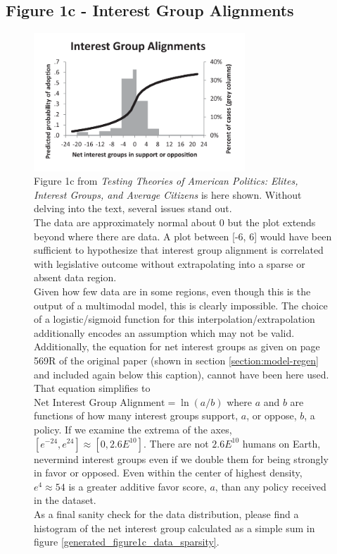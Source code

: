 \documentclass[]{article}
\begin{document}
\subsection{Figure 1c - Interest Group Alignments}
\begin{figure}[H]
	\begin{center}
		\includegraphics[width=300px]{./figures/paper/interest-group-preferences.png}
	\end{center}	
	\caption{Figure 1c from \textit{Testing Theories of American Politics: Elites, Interest Groups, and Average Citizens} is here shown. Without delving into the text, several issues stand out. \\The data are approximately normal about 0 but the plot extends beyond where there are data. A plot between [-6, 6] would have been sufficient to hypothesize that interest group alignment is correlated with legislative outcome without extrapolating into a sparse or absent data region. \\Given how few data are in some regions, even though this is the output of a multimodal model, this is clearly impossible. The choice of a logistic/sigmoid function for this interpolation/extrapolation additionally encodes an assumption which may not be valid. \\Additionally, the equation for net interest groups as given on page 569R of the original paper (shown in section \ref{section:model-regen} and included again below this caption), cannot have been here used. That equation simplifies to $\text{Net Interest Group Alignment} = \ln(a/b)$ where $a$ and $b$ are functions of how many interest groups support, $a$, or oppose, $b$, a policy. If we examine the extrema of the axes, $[e^{-24}, e^{24}] \approx [0, 2.6E^{10}]$. There are not $2.6E^{10}$ humans on Earth, nevermind interest groups even if we double them for being strongly in favor or opposed. Even within the center of highest density, $e^{4} \approx 54$ is a greater additive favor score, $a$, than any policy received in the dataset.\\As a final sanity check for the data distribution, please find a histogram of the net interest group calculated as a simple sum in figure \ref{generated_figure1c_data_sparsity}.}
	\label{paper_figure1c}
\end{figure}
\end{document}
